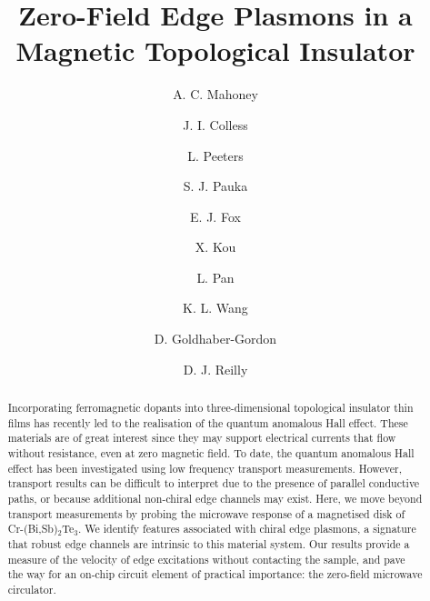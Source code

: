 \makeatletter\frontmatter@init\makeatother

\title{Zero-Field Edge Plasmons in a Magnetic Topological Insulator}

\author{A. C. Mahoney}
\author{J. I. Colless}
\author{L. Peeters}
\author{S. J. Pauka}
\author{E. J. Fox}
\author{X. Kou}
\author{L. Pan}
\author{K. L. Wang}
\author{D. Goldhaber-Gordon}
\author{D. J. Reilly}

\makeatletter
\begingroup
\@author@finish
\frontmatter@author@produce@script
\endgroup
\makeatother

\begin{abstract}
Incorporating ferromagnetic dopants into three-dimensional topological insulator thin films has recently led to the realisation of the quantum anomalous Hall effect. These materials are of great interest since they may support electrical currents that flow without resistance, even at zero magnetic field. To date, the quantum anomalous Hall effect has been investigated using low frequency transport measurements. However, transport results can be difficult to interpret due to the presence of parallel conductive paths, or because additional non-chiral edge channels may exist. Here, we move beyond transport measurements by probing the microwave response of a magnetised disk of Cr-(Bi,Sb)$_2$Te$_3$. We identify features associated with chiral edge plasmons, a signature that robust edge channels are intrinsic to this material system. Our results provide a measure of the velocity of edge excitations without contacting the sample, and pave the way for an on-chip circuit element of practical importance: the zero-field microwave circulator.
\end{abstract}

